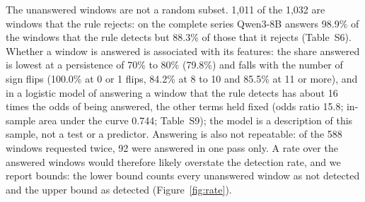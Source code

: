 The unanswered windows are not a random subset. 1{,}011 of the 1{,}032 are windows that the rule rejects: on the complete series Qwen3-8B answers 98.9\% of the windows that the rule detects but 88.3\% of those that it rejects (Table~S6). Whether a window is answered is associated with its features: the share answered is lowest at a persistence of 70\% to 80\% (79.8\%) and falls with the number of sign flips (100.0\% at 0 or 1 flips, 84.2\% at 8 to 10 and 85.5\% at 11 or more), and in a logistic model of answering a window that the rule detects has about 16 times the odds of being answered, the other terms held fixed (odds ratio 15.8; in-sample area under the curve 0.744; Table~S9); the model is a description of this sample, not a test or a predictor. Answering is also not repeatable: of the 588 windows requested twice, 92 were answered in one pass only. A rate over the answered windows would therefore likely overstate the detection rate, and we report bounds: the lower bound counts every unanswered window as not detected and the upper bound as detected (Figure~\ref{fig:rate}).

